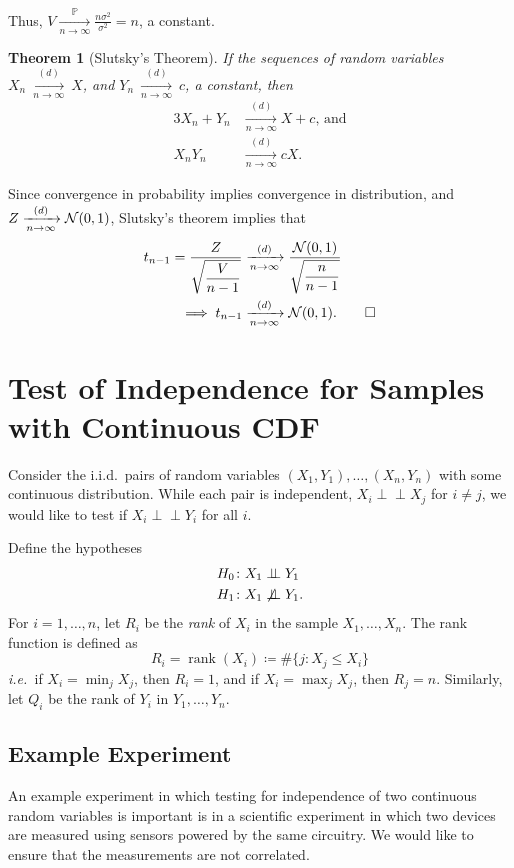 \documentclass[letterpaper, reqno]{amsart}
\newtheorem{theorem}{Theorem}[section]
\numberwithin{equation}{section}
\newcommand{\ie}{\emph{i.e.\ }}
\newcommand{\ddfrac}[2]{\frac{\displaystyle #1}{\displaystyle #2}}
\newcommand{\N}[2]{\mathcal{N}\mleft( #1, #2 \mright)}
\newcommand{\indep}{\perp \!\!\! \perp}  %
\newcommand{\nindep}{\centernot\indep}
\newcommand{\iid}{i.i.d.}
\newcommand{\Plim}{\xrightarrow[n \to \infty]{\mathbb{P}}}
\newcommand{\Dlim}{\xrightarrow[n \to \infty]{(d)}}
\begin{document}
Thus, $V \Plim \frac{n \sigma^2}{\sigma^2} = n$, a constant.

\begin{theorem}[Slutsky's Theorem]
  If the sequences of random variables $X_n~\Dlim~X$, and $Y_n~\Dlim~c$,
  a constant, then
  \begin{alignat*}{3}
    X_n + Y_n &\Dlim X + c \text{, and} \\
    X_n Y_n &\Dlim cX.
  \end{alignat*}
\end{theorem}

Since convergence in probability implies convergence in distribution, and $Z
\Dlim \N{0}{1}$, Slutsky's theorem implies that
\begin{align*}
  t_{n-1} = \ddfrac{Z}{\sqrt{\frac{V}{n-1}}}
        &\Dlim \ddfrac{\N{0}{1}}{\sqrt{\frac{n}{n-1}}} \\
        \implies t_{n-1} &\Dlim \N{0}{1}.  \qed
\end{align*}

\clearpage
\section{Test of Independence for Samples with Continuous CDF}
Consider the \iid\ pairs of random variables $(X_1, Y_1), \dots, (X_n, Y_n)$
with some continuous distribution. While each pair is independent, $X_i \indep
X_j$ for $i \ne j$, we would like to test if $X_i \indep Y_i$ for all $i$.

Define the hypotheses
\begin{align*}
  H_0 &\colon X_1 \indep Y_1 \\
  H_1 &\colon X_1 \nindep Y_1.
\end{align*}
For $i = 1, \dots, n$, let $R_i$ be the \emph{rank} of $X_i$ in the sample $X_1,
\dots, X_n$. The rank function is defined as
\[ R_i = \operatorname{rank}(X_i) \coloneqq \#\{j \colon X_j \le X_i\}  \]
\ie if $X_i = \min_j X_j$, then $R_i = 1$, and if $X_i = \max_j
X_j$, then $R_j = n$.
Similarly, let $Q_i$ be the rank of $Y_i$ in $Y_1, \dots, Y_n$.

\subsection{Example Experiment}
An example experiment in which testing for independence of two continuous random
variables is important is in a scientific experiment in which two devices are
measured using sensors powered by the same circuitry. We would like to ensure
that the measurements are not correlated.
\end{document}
